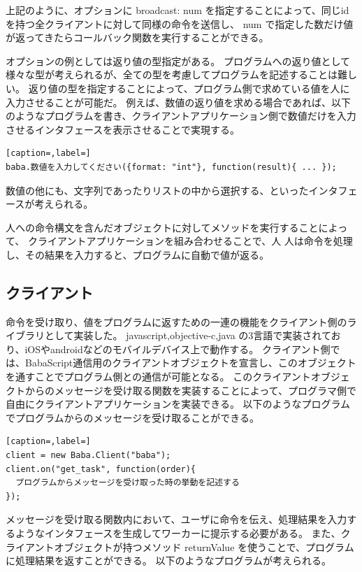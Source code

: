 \documentclass{deimj}
\begin{document}
上記のように、オプションに broadcast: num を指定することによって、同じidを持つ全クライアントに対して同様の命令を送信し、 num で指定した数だけ値が返ってきたらコールバック関数を実行することができる。

オプションの例としては返り値の型指定がある。
プログラムへの返り値として様々な型が考えられるが、全ての型を考慮してプログラムを記述することは難しい。
返り値の型を指定することによって、プログラム側で求めている値を人に入力させることが可能だ。
例えば、数値の返り値を求める場合であれば、以下のようなプログラムを書き、クライアントアプリケーション側で数値だけを入力させるインタフェースを表示させることで実現する。

\begin{lstlisting}[caption=,label=]
baba.数値を入力してください({format: "int"}, function(result){ ... });
\end{lstlisting}
数値の他にも、文字列であったりリストの中から選択する、といったインタフェースが考えられる。

人への命令構文を含んだオブジェクトに対してメソッドを実行することによって、
クライアントアプリケーションを組み合わせることで、人
人は命令を処理し、その結果を入力すると、プログラムに自動で値が返る。

\subsection{クライアント}

命令を受け取り、値をプログラムに返すための一連の機能をクライアント側のライブラリとして実装した。
javascript,objective-c,java の3言語で実装されており、iOSやandroidなどのモバイルデバイス上で動作する。
クライアント側では、BabaScript通信用のクライアントオブジェクトを宣言し、このオブジェクトを通すことでプログラム側との通信が可能となる。
このクライアントオブジェクトからのメッセージを受け取る関数を実装することによって、プログラマ側で自由にクライアントアプリケーションを実装できる。
以下のようなプログラムでプログラムからのメッセージを受け取ることができる。

\begin{lstlisting}[caption=,label=]
client = new Baba.Client("baba");
client.on("get_task", function(order){
  プログラムからメッセージを受け取った時の挙動を記述する
});
\end{lstlisting}

メッセージを受け取る関数内において、ユーザに命令を伝え、処理結果を入力するようなインタフェースを生成してワーカーに提示する必要がある。
また、クライアントオブジェクトが持つメソッド returnValue を使うことで、プログラムに処理結果を返すことができる。
以下のようなプログラムが考えられる。
\end{document}
